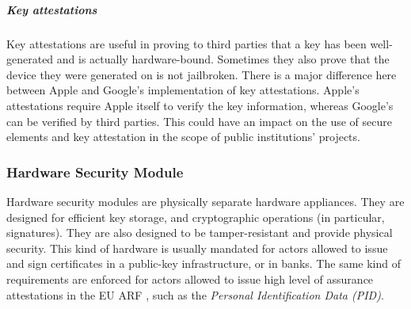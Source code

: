 \subparagraph{Key attestations} Key attestations are useful in proving to third parties that a key has been well-generated and is actually hardware-bound. Sometimes they also prove that the device they were generated on is not jailbroken. There is a major difference here between Apple and Google's implementation of key attestations. Apple's attestations require Apple itself to verify the key information, whereas Google's can be verified by third parties. This could have an impact on the use of secure elements and key attestation in the scope of public institutions' \eid projects.

\subsubsection{Hardware Security Module} Hardware security modules are physically separate hardware appliances. They are designed for efficient key storage, and cryptographic operations (in particular, signatures). They are also designed to be tamper-resistant and provide physical security. This kind of hardware is usually mandated for actors allowed to issue and sign certificates in a public-key infrastructure, or in banks. The same kind of requirements are enforced for actors allowed to issue high level of assurance attestations in the EU ARF \cite{EUDI-ARF}, such as the \emph{Personal Identification Data (PID)}.

